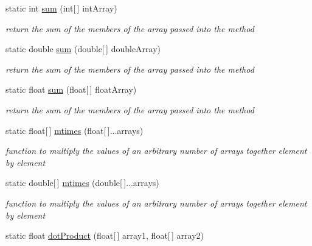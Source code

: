 \begin{DoxyCompactItemize}
\item 
static int \hyperlink{classuk_1_1ac_1_1dmu_1_1iesd_1_1cascade_1_1util_1_1_array_utils_a8d4b59d9305b9dc4e06184b1299fc7e6}{sum} (int\mbox{[}$\,$\mbox{]} int\-Array)
\begin{DoxyCompactList}\small\item\em return the sum of the members of the array passed into the method \end{DoxyCompactList}\item 
static double \hyperlink{classuk_1_1ac_1_1dmu_1_1iesd_1_1cascade_1_1util_1_1_array_utils_a50430a7b71868948ee1fbca64ece53a4}{sum} (double\mbox{[}$\,$\mbox{]} double\-Array)
\begin{DoxyCompactList}\small\item\em return the sum of the members of the array passed into the method \end{DoxyCompactList}\item 
static float \hyperlink{classuk_1_1ac_1_1dmu_1_1iesd_1_1cascade_1_1util_1_1_array_utils_aceffdcaae593e327dd48024f9d4f09c4}{sum} (float\mbox{[}$\,$\mbox{]} float\-Array)
\begin{DoxyCompactList}\small\item\em return the sum of the members of the array passed into the method \end{DoxyCompactList}\item 
static float\mbox{[}$\,$\mbox{]} \hyperlink{classuk_1_1ac_1_1dmu_1_1iesd_1_1cascade_1_1util_1_1_array_utils_a2674fa4ff35ab7c1d015785133318fe7}{mtimes} (float\mbox{[}$\,$\mbox{]}...arrays)
\begin{DoxyCompactList}\small\item\em function to multiply the values of an arbitrary number of arrays together element by element \end{DoxyCompactList}\item 
static double\mbox{[}$\,$\mbox{]} \hyperlink{classuk_1_1ac_1_1dmu_1_1iesd_1_1cascade_1_1util_1_1_array_utils_a2c02f1fbaf51961a0a657db030d2c743}{mtimes} (double\mbox{[}$\,$\mbox{]}...arrays)
\begin{DoxyCompactList}\small\item\em function to multiply the values of an arbitrary number of arrays together element by element \end{DoxyCompactList}\item 
static float \hyperlink{classuk_1_1ac_1_1dmu_1_1iesd_1_1cascade_1_1util_1_1_array_utils_ae28673c65f4201d7314e0d0acdb11062}{dot\-Product} (float\mbox{[}$\,$\mbox{]} array1, float\mbox{[}$\,$\mbox{]} array2)

\end{DoxyCompactItemize}
